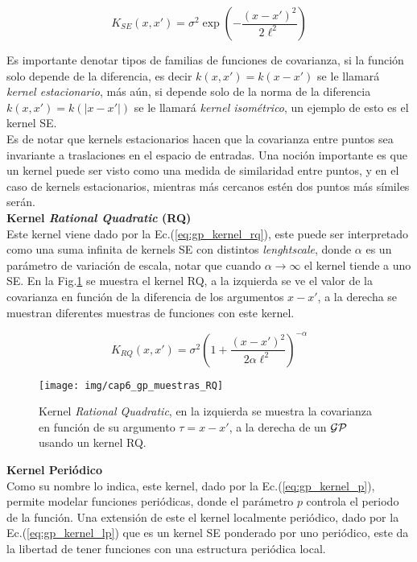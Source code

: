 \begin{equation}\label{eq:gp_kernel_se}
	K_{SE}(x, x') = \sigma^2 \exp\left( - \frac{\left( x- x'\right)^2}{2\ell^2} \right)
\end{equation}

Es importante denotar tipos de familias de funciones de covarianza, si la función solo depende de la diferencia, es decir $k(x, x')=k(x-x')$ se le llamará \textit{kernel estacionario}, más aún, si depende solo de la norma de la diferencia $k(x, x')=k(|x-x'|)$ se le llamará \textit{kernel isométrico}, un ejemplo de esto es el kernel SE.\\

Es de notar que kernels estacionarios hacen que la covarianza entre puntos sea invariante a traslaciones en el espacio de entradas. Una noción importante es que un kernel puede ser visto como una medida de similaridad entre puntos, y en el caso de kernels estacionarios, mientras más cercanos estén dos puntos más símiles serán.\\

\textbf{Kernel \textit{Rational Quadratic} (RQ)}\\

Este kernel viene dado por la Ec.(\ref{eq:gp_kernel_rq}), este puede ser interpretado como una suma infinita de kernels SE con distintos \textit{lenghtscale}, donde $\alpha$ es un parámetro de variación de escala, notar que cuando $\alpha \rightarrow \infty$ el kernel tiende a uno SE. En la Fig.\ref{fig:gp_6} se muestra el kernel RQ, a la izquierda se ve el valor de la covarianza en función de la diferencia de los argumentos $x-x'$, a la derecha se muestran diferentes muestras de funciones con este kernel.
 
\begin{equation}\label{eq:gp_kernel_rq}
	K_{RQ}(x, x') = \sigma^2 \left(1 + \frac{\left( x- x'\right)^2}{2\alpha\ell^2 } \right)^{-\alpha}
\end{equation}


\begin{figure}[H]
	\centering
	\texttt{[image: img/cap6\_gp\_muestras\_RQ]}
	\caption{Kernel \textit{Rational Quadratic}, en la izquierda se muestra la covarianza en función de su argumento $\tau=x-x'$, a la derecha de un $\mathcal{GP}$ usando un kernel RQ.}
	\label{fig:gp_6}
\end{figure}

\textbf{Kernel Periódico}\\

Como su nombre lo indica, este kernel, dado por la Ec.(\ref{eq:gp_kernel_p}), permite modelar funciones periódicas, donde el parámetro $p$ controla el periodo de la función. Una extensión de este el kernel localmente periódico, dado por la Ec.(\ref{eq:gp_kernel_lp}) que es un kernel SE ponderado por uno periódico, este da la libertad de tener funciones con una estructura periódica local.


